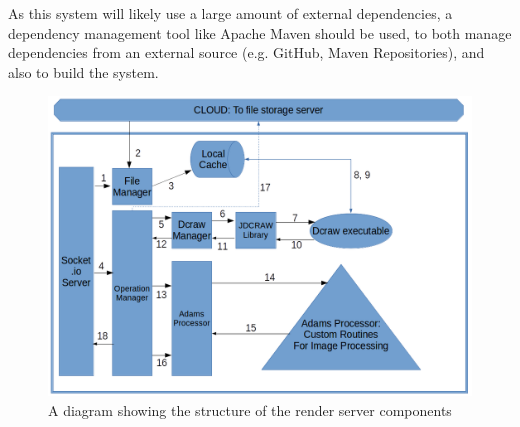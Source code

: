 \documentclass[12pt,a4paper]{article}
\begin{document}
As this system will likely use a large amount of external dependencies, a dependency management tool
like Apache Maven should be used, to both manage dependencies from an external source (e.g. GitHub, Maven
Repositories), and also to build the system.

\begin{figure}[h]
    \centering
    \includegraphics[width=1\textwidth]{renderserverdiagram}
    \caption{A diagram showing the structure of the render server components}
    \label{RenderServerDiagram}
\end{figure}
\end{document}
